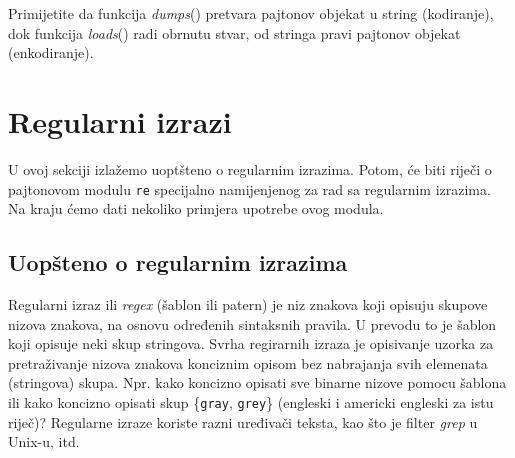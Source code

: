 Primijetite da funkcija \textit{dumps}() pretvara pajtonov objekat u string (kodiranje), dok funkcija \textit{loads}() radi obrnutu stvar, od stringa pravi pajtonov objekat (enkodiranje). 

\section{Regularni izrazi}

U ovoj sekciji izlažemo uoptšteno o regularnim izrazima. Potom, će biti riječi o pajtonovom modulu \texttt{re} specijalno namijenjenog za rad sa regularnim izrazima. Na kraju ćemo dati nekoliko primjera upotrebe ovog modula. 

\subsection{Uopšteno o regularnim izrazima}

Regularni izraz ili \textit{regex} (šablon ili patern) je niz znakova koji opisuju skupove nizova znakova, na osnovu određenih sintaksnih pravila. U prevodu to je šablon koji opisuje neki skup stringova.  Svrha regirarnih izraza je opisivanje uzorka za pretraživanje nizova znakova konciznim opisom bez nabrajanja svih elemenata (stringova) skupa. Npr. kako koncizno opisati sve binarne nizove
pomocu šablona ili kako koncizno opisati skup \{\texttt{gray}, \texttt{grey}\} (engleski i
americki engleski za istu riječ)? Regularne izraze koriste razni uređivači teksta, kao što je filter \textit{grep} u Unix-u, itd. 

